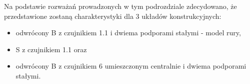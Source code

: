 \indent Na podstawie rozważań prowadzonych w tym podrozdziale zdecydowano, że 
przedstawione zostaną charakterystyki dla 3 układów konstrukcyjnych:
\begin{itemize}
    \item odwrócony B z czujnikiem 1.1 i dwiema podporami stałymi - model rury,
    \item S z czujnikiem 1.1 oraz
    \item odwrócony B z czujnikiem 6 umieszczonym centralnie i dwiema podporami stałymi.
\end{itemize}